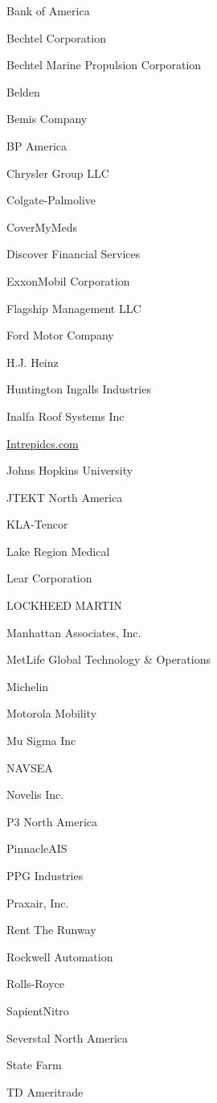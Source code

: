 \documentclass[twoside]{article}
\begin{document}
\begin{center}
\begin{multicols}{5}
\begin{FlushLeft}
\begin{compactitem}
\item Bank of America
\item Bechtel Corporation
\item Bechtel Marine Propulsion Corporation
\item Belden
\item Bemis Company
\item BP America
\item Chrysler Group LLC
\item Colgate-Palmolive
\item CoverMyMeds
\item Discover Financial Services
\item ExxonMobil Corporation
\item Flagship Management LLC
\item Ford Motor Company
\item H.J. Heinz
\item Huntington Ingalls Industries
\item Inalfa Roof Systems Inc
\item \url{Intrepidcs.com}
\item Johns Hopkins University
\item JTEKT North America
\item KLA-Tencor
\item Lake Region Medical
\item Lear Corporation
\item LOCKHEED MARTIN
\item Manhattan Associates, Inc.
\item MetLife Global Technology \& Operations
\item Michelin
\item Motorola Mobility
\item Mu Sigma Inc
\item NAVSEA
\item Novelis Inc.
\item P3 North America
\item PinnacleAIS
\item PPG Industries
\item Praxair, Inc.
\item Rent The Runway
\item Rockwell Automation
\item Rolls-Royce
\item SapientNitro
\item Severstal North America
\item State Farm
\item TD Ameritrade

\end{compactitem}
\end{FlushLeft}
\end{multicols}
\end{center}
\end{document}
